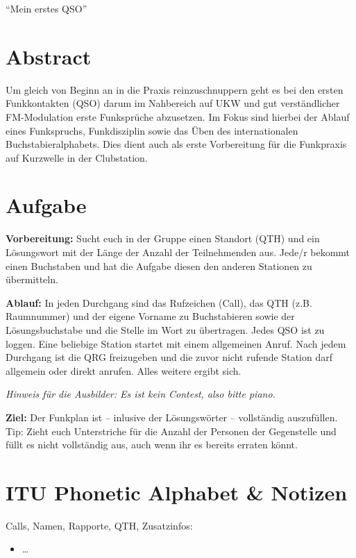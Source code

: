 \documentclass[a4paper,10pt]{article}
\begin{document}
\begin{center}
    \Large ``Mein erstes QSO''
\end{center}

\vspace{-1.5em}

\section{Abstract}

Um gleich von Beginn an in die Praxis reinzuschnuppern geht es bei den ersten
Funkkontakten (QSO) darum im Nahbereich auf UKW und gut verständlicher
FM-Modulation erste Funksprüche abzusetzen. Im Fokus sind hierbei der Ablauf
eines Funkspruchs, Funkdisziplin sowie das Üben des internationalen
Buchstabieralphabets. Dies dient auch als erste Vorbereitung für die Funkpraxis
auf Kurzwelle in der Clubstation.

\section{Aufgabe}

\textbf{Vorbereitung:} Sucht euch in der Gruppe einen Standort (QTH) und ein
Lösungswort mit der Länge der Anzahl der Teilnehmenden aus. Jede/r bekommt einen
Buchstaben und hat die Aufgabe diesen den anderen Stationen zu übermitteln.
\bigskip

\textbf{Ablauf:} In jeden Durchgang sind das Rufzeichen (Call), das QTH (z.B.
Raumnummer) und der eigene Vorname zu Buchstabieren sowie der Lösungsbuchstabe
und die Stelle im Wort zu übertragen. Jedes QSO ist zu loggen. Eine beliebige
Station startet mit einem allgemeinen Anruf. Nach jedem Durchgang ist die QRG
freizugeben und die zuvor nicht rufende Station darf allgemein oder direkt
anrufen. Alles weitere ergibt sich.

\textit{Hinweis für die Ausbilder: Es ist kein Contest, also bitte piano.}
\bigskip

\textbf{Ziel:} Der Funkplan ist -- inlusive der Lösungswörter -- vollständig
auszufüllen. Tip: Zieht euch Unterstriche für die Anzahl der Personen der
Gegenstelle und füllt es nicht vollständig aus, auch wenn ihr es bereits erraten
könnt.

\section{ITU Phonetic Alphabet \& Notizen}

\hspace{4cm}
\begin{minipage}[t]{0.5\textwidth}
    Calls, Namen, Rapporte, QTH, Zusatzinfos:
    \begin{itemize}
        \item \dots
    \end{itemize}
\end{minipage}
\end{document}
